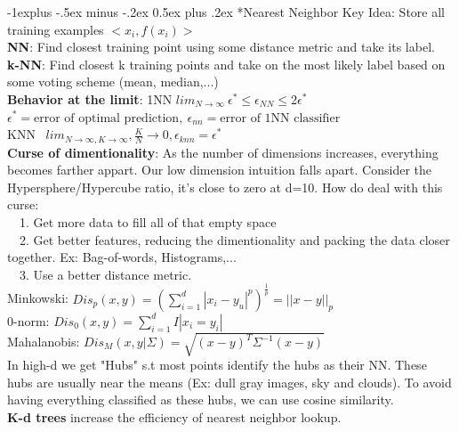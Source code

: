 \documentclass[3pt,landscape]{article}
\makeatletter
\renewcommand{\subsection}{\@startsection{subsection}{2}{0mm}%
                            {-1explus -.5ex minus -.2ex}%
                            {0.5ex plus .2ex}%
                            {\normalfont\normalsize\bfseries}}
\makeatother
\begin{document}
\begin{multicols}{3}

\subsection*{Nearest Neighbor}
Key Idea: Store all training examples $<x_i,f(x_i)>$\\
{\bf NN}: Find closest training point using some distance metric and take its label.\\
{\bf k-NN}: Find closest k training points and take on the most likely label based on some voting scheme (mean, median,...)\\
{\bf Behavior at the limit}: 1NN $lim_{N\to\infty}\ \epsilon^*\le\epsilon_{NN}\le 2\epsilon^*$
$\epsilon^*=\text{error of optimal prediction},\ \epsilon_{nn}=\text{error of 1NN classifier}$\\
KNN \ $lim_{N\to\infty,K\to\infty}, \frac{K}{N}\to 0, \epsilon_{knn}=\epsilon^*$\\
{\bf Curse of dimentionality}: As the number of dimensions increases, everything becomes farther appart. Our low dimension intuition falls apart. Consider the Hypersphere/Hypercube ratio, it's close to zero at d=10.
How do deal with this curse:\\
\ \ 1. Get more data to fill all of that empty space\\
\ \ 2. Get better features, reducing the dimentionality and packing the data closer together. Ex: Bag-of-words, Histograms,...\\
\ \ 3. Use a better distance metric.\\
Minkowski: $Dis_p(x,y)=(\sum_{i=1}^d|x_i-y_u|^p)^{\frac{1}{p}}=||x-y||_p$\\
0-norm: $Dis_0(x,y)=\sum_{i=1}^d I|x_i=y_i|$\\
Mahalanobis: $Dis_M(x,y|\Sigma)=\sqrt{(x-y)^T\Sigma^{-1}(x-y)}$\\
In high-d we get "Hubs" s.t most points identify the hubs as their NN. These hubs are usually near the means (Ex: dull gray images, sky and clouds). To avoid having everything classified as these hubs, we can use cosine similarity.\\
{\bf K-d trees} increase the efficiency of nearest neighbor lookup.



\end{multicols}
\end{document}
